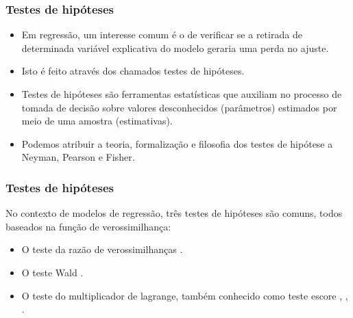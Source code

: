 \documentclass[10pt,
  aspectratio=169,
  serif,
  mathserif,
  professionalfont,
  compress,
  handout,
  ]{beamer}\usepackage[]{graphicx}\usepackage[]{color}
\begin{document}

\begin{frame}
  \frametitle{Testes de hipóteses}

  \begin{itemize}
    \itemsep 2ex

  \item Em regressão, um interesse comum é o de verificar se a retirada de determinada variável explicativa do modelo geraria uma perda no ajuste. 
  
  \item Isto é feito através dos chamados testes de hipóteses. 

  \item Testes de hipóteses são ferramentas estatísticas que auxiliam no processo de tomada de decisão sobre valores desconhecidos (parâmetros) estimados por meio de uma amostra (estimativas).
  
  \item Podemos atribuir a teoria, formalização e filosofia dos testes de hipótese a Neyman, Pearson e Fisher.
  
  \end{itemize}
\end{frame}


\begin{frame}
  \frametitle{Testes de hipóteses}

No contexto de modelos de regressão, três testes de hipóteses são comuns, todos baseados na função de verossimilhança: 

\begin{itemize}
  \item O teste da razão de verossimilhanças \cite{trv}.
  \item O teste Wald \cite{wald}.
  \item O teste do multiplicador de lagrange, também conhecido como teste escore \cite{score1}, \cite{score2}, \cite{score3}.
\end{itemize}


\end{frame}

\end{document}
